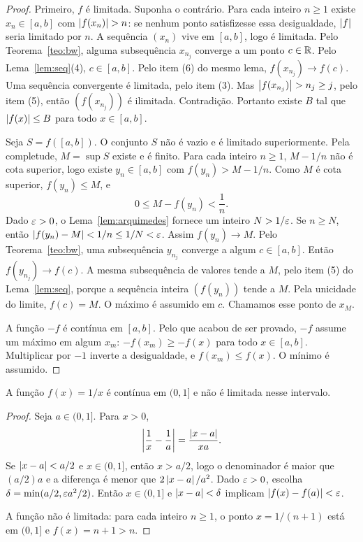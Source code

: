\documentclass[11pt,a4paper]{article}
\begin{document}
\begin{proof}
Primeiro, $f$ \'e limitada. Suponha o contr\'ario. Para cada inteiro $n\ge 1$ existe $x_n\in[a,b]$ com $\left\lvert f(x_n) \right\rvert>n$: se nenhum ponto satisfizesse essa desigualdade, $\left\lvert f \right\rvert$ seria limitado por $n$. A sequ\^encia $(x_n)$ vive em $[a,b]$, logo \'e limitada. Pelo Teorema~\ref{teo:bw}, alguma subsequ\^encia $x_{n_j}$ converge a um ponto $c\in\mathbb{R}$. Pelo Lema~\ref{lem:seq}(4), $c\in[a,b]$. Pelo item (6) do mesmo lema, $f(x_{n_j})\to f(c)$. Uma sequ\^encia convergente \'e limitada, pelo item (3). Mas $\left\lvert f(x_{n_j}) \right\rvert>n_j\ge j$, pelo item (5), ent\~ao $(f(x_{n_j}))$ \'e ilimitada. Contradi\c{c}\~ao. Portanto existe $B$ tal que $\left\lvert f(x) \right\rvert\le B$ para todo $x\in[a,b]$.

Seja $S=f([a,b])$. O conjunto $S$ n\~ao \'e vazio e \'e limitado superiormente. Pela completude, $M=\sup S$ existe e \'e finito. Para cada inteiro $n\ge 1$, $M-1/n$ n\~ao \'e cota superior, logo existe $y_n\in[a,b]$ com $f(y_n)>M-1/n$. Como $M$ \'e cota superior, $f(y_n)\le M$, e
\[
0\le M-f(y_n)<\frac{1}{n}.
\]
Dado $\varepsilon>0$, o Lema~\ref{lem:arquimedes} fornece um inteiro $N>1/\varepsilon$. Se $n\ge N$, ent\~ao $\left\lvert f(y_n)-M \right\rvert<1/n\le 1/N<\varepsilon$. Assim $f(y_n)\to M$. Pelo Teorema~\ref{teo:bw}, uma subsequ\^encia $y_{n_j}$ converge a algum $c\in[a,b]$. Ent\~ao $f(y_{n_j})\to f(c)$. A mesma subsequ\^encia de valores tende a $M$, pelo item (5) do Lema~\ref{lem:seq}, porque a sequ\^encia inteira $(f(y_n))$ tende a $M$. Pela unicidade do limite, $f(c)=M$. O m\'aximo \'e assumido em $c$. Chamamos esse ponto de $x_M$.

A fun\c{c}\~ao $-f$ \'e cont\'inua em $[a,b]$. Pelo que acabou de ser provado, $-f$ assume um m\'aximo em algum $x_m$: $-f(x_m)\ge -f(x)$ para todo $x\in[a,b]$. Multiplicar por $-1$ inverte a desigualdade, e $f(x_m)\le f(x)$. O m\'inimo \'e assumido.
\end{proof}

\begin{proposicao}
\label{prop:um-sobre-x}
A fun\c{c}\~ao $f(x)=1/x$ \'e cont\'inua em $(0,1]$ e n\~ao \'e limitada nesse intervalo.
\end{proposicao}

\begin{proof}
Seja $a\in(0,1]$. Para $x>0$,
\[
\left\lvert \frac{1}{x}-\frac{1}{a} \right\rvert=\frac{\left\lvert x-a \right\rvert}{x a}.
\]
Se $\left\lvert x-a \right\rvert<a/2$ e $x\in(0,1]$, ent\~ao $x>a/2$, logo o denominador \'e maior que $(a/2)a$ e a diferen\c{c}a \'e menor que $2\left\lvert x-a \right\rvert/a^2$. Dado $\varepsilon>0$, escolha $\delta=\min(a/2,\varepsilon a^2/2)$. Ent\~ao $x\in(0,1]$ e $\left\lvert x-a \right\rvert<\delta$ implicam $\left\lvert f(x)-f(a) \right\rvert<\varepsilon$.

A fun\c{c}\~ao n\~ao \'e limitada: para cada inteiro $n\ge 1$, o ponto $x=1/(n+1)$ est\'a em $(0,1]$ e $f(x)=n+1>n$.
\end{proof}
\end{document}
